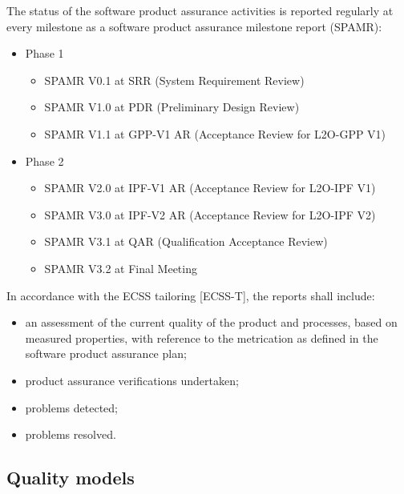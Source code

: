 The status of the software product assurance activities is reported regularly at every milestone as a software product assurance milestone report (SPAMR):
\begin{itemize}
    \item Phase 1
    \begin{itemize}
        \item SPAMR V0.1 at SRR (System Requirement Review)
        \item SPAMR V1.0 at PDR (Preliminary Design Review)
        \item SPAMR V1.1 at GPP-V1 AR (Acceptance Review for L2O-GPP V1)
    \end{itemize}
    \item Phase 2
    \begin{itemize}
        \item SPAMR V2.0 at IPF-V1 AR (Acceptance Review for L2O-IPF V1)
        \item SPAMR V3.0 at IPF-V2 AR (Acceptance Review for L2O-IPF V2)
        \item SPAMR V3.1 at QAR (Qualification Acceptance Review)
        \item SPAMR V3.2 at Final Meeting
    \end{itemize}
\end{itemize}

In accordance with the ECSS tailoring [ECSS-T], the reports shall include:
\begin{itemize}
    \item an assessment of the current quality of the product and processes, based on measured properties, with reference to the metrication as defined in the software product assurance plan;
    \item product assurance verifications undertaken;
    \item problems detected;
    \item problems resolved.
\end{itemize}

\subsection{Quality models}
\label{subsec:quality-models}

%

